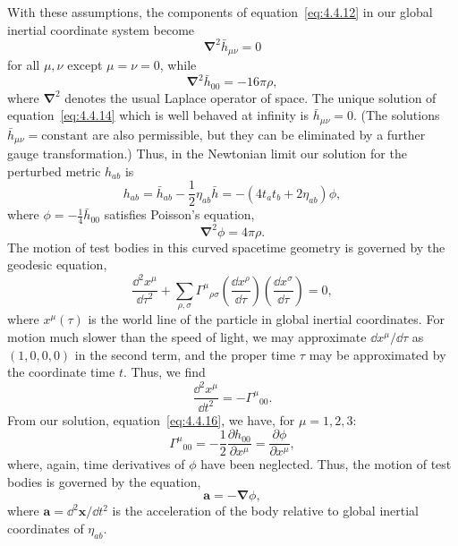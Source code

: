 With these assumptions, the components of equation~\eqref{eq:4.4.12} in our
global inertial coordinate system become
\begin{equation}
  \boldsymbol\nabla^2\bar h_{\mu\nu}=0
  \tag{4.4.14}\label{eq:4.4.14}
\end{equation}
for all \(\mu,\nu\) except \(\mu=\nu=0\), while
\begin{equation}
  \boldsymbol\nabla^2\bar h_{00}=-16\pi\rho ,
  \tag{4.4.15}\label{eq:4.4.15}
\end{equation}
where \(\boldsymbol\nabla^2\) denotes the usual Laplace operator of space. The
unique solution of equation~\eqref{eq:4.4.14} which is well behaved at infinity is
\(\bar h_{\mu\nu}=0\). (The solutions \(\bar h_{\mu\nu}=\text{constant}\) are
also permissible, but they can be eliminated by a further gauge transformation.)
Thus, in the Newtonian limit our solution for the perturbed metric \(h_{ab}\) is
\begin{equation}
  h_{ab}=\bar h_{ab}-\frac12\eta_{ab}\bar h
    =-(4t_at_b+2\eta_{ab})\phi ,
  \tag{4.4.16}\label{eq:4.4.16}
\end{equation}
where \(\phi=-\tfrac14\bar h_{00}\) satisfies Poisson's equation,
\begin{equation}
  \boldsymbol\nabla^2\phi=4\pi\rho .
  \tag{4.4.17}\label{eq:4.4.17}
\end{equation}
The motion of test bodies in this curved spacetime geometry is governed by the
geodesic equation,
\begin{equation}
  \frac{\dd^2x^\mu}{\dd\tau^2}
    +\sum_{\rho,\sigma}\Gamma^\mu{}_{\rho\sigma}
      \left(\frac{\dd x^\rho}{\dd\tau}\right)
      \left(\frac{\dd x^\sigma}{\dd\tau}\right)=0 ,
  \tag{4.4.18}\label{eq:4.4.18}
\end{equation}
where \(x^\mu(\tau)\) is the world line of the particle in global inertial
coordinates. For motion much slower than the speed of light, we may approximate
\(\dd x^\mu/\dd\tau\) as \((1,0,0,0)\) in the second term, and the proper time
\(\tau\) may be approximated by the coordinate time \(t\). Thus, we find
\begin{equation}
  \frac{\dd^2x^\mu}{\dd t^2}=-\Gamma^\mu{}_{00} .
  \tag{4.4.19}\label{eq:4.4.19}
\end{equation}
From our solution, equation~\eqref{eq:4.4.16}, we have, for \(\mu=1,2,3\):
\begin{equation}
  \Gamma^\mu{}_{00}=-\frac12\frac{\partial h_{00}}{\partial x^\mu}
    =\frac{\partial\phi}{\partial x^\mu} ,
  \tag{4.4.20}\label{eq:4.4.20}
\end{equation}
where, again, time derivatives of \(\phi\) have been neglected. Thus, the motion of
test bodies is governed by the equation,
\begin{equation}
  \mathbf{a}=-\boldsymbol{\nabla}\phi ,
  \tag{4.4.21}\label{eq:4.4.21}
\end{equation}
where \(\mathbf{a}=\dd^2\mathbf{x}/\dd t^2\) is the acceleration of the body relative to
global inertial coordinates of \(\eta_{ab}\).

